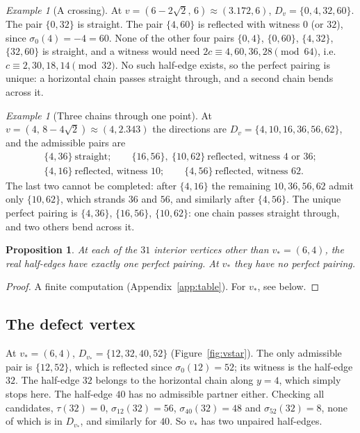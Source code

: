 \documentclass[11pt]{article}
\newtheorem{proposition}[theorem]{Proposition}
\theoremstyle{definition}
\theoremstyle{remark}
\newtheorem{example}[theorem]{Example}
\newcommand{\vstar}{v_\ast}
\begin{document}
\begin{example}[A crossing]\label{ex:deg4}
At $v=(6-2\sqrt2,\,6)\approx(3.172,6)$, $D_v=\{0,4,32,60\}$. The pair $\{0,32\}$ is straight. The pair $\{4,60\}$ is reflected with witness $0$ (or $32$), since $\sigma_0(4)=-4=60$. None of the other four pairs $\{0,4\}$, $\{0,60\}$, $\{4,32\}$, $\{32,60\}$ is straight, and a witness would need $2c\equiv 4,60,36,28\pmod{64}$, i.e.\ $c\equiv 2,30,18,14\pmod{32}$. No such half-edge exists, so the perfect pairing is unique: a horizontal chain passes straight through, and a second chain bends across it.
\end{example}

\begin{example}[Three chains through one point]\label{ex:deg6}
At $v=(4,\,8-4\sqrt2)\approx(4,2.343)$ the directions are $D_v=\{4,10,16,\allowbreak 36,56,62\}$, and the admissible pairs are
\[
\begin{gathered}
\{4,36\}\ \text{straight};\qquad \{16,56\},\ \{10,62\}\ \text{reflected, witness }4\text{ or }36;\\
\{4,16\}\ \text{reflected, witness }10;\qquad \{4,56\}\ \text{reflected, witness }62.
\end{gathered}
\]
The last two cannot be completed: after $\{4,16\}$ the remaining $10,36,56,62$ admit only $\{10,62\}$, which strands $36$ and $56$, and similarly after $\{4,56\}$. The unique perfect pairing is $\{4,36\}$, $\{16,56\}$, $\{10,62\}$: one chain passes straight through, and two others bend across it.
\end{example}

\begin{proposition}\label{prop:local}
At each of the $31$ interior vertices other than $\vstar=(6,4)$, the real half-edges have exactly one perfect pairing. At $\vstar$ they have no perfect pairing.
\end{proposition}
\begin{proof}
A finite computation (Appendix~\ref{app:table}). For $\vstar$, see below.
\end{proof}

\subsection{The defect vertex}\label{sec:defect}

At $\vstar=(6,4)$, $D_{\vstar}=\{12,32,40,52\}$ (Figure~\ref{fig:vstar}). The only admissible pair is $\{12,52\}$, which is reflected since $\sigma_0(12)=52$; its witness is the half-edge $32$. The half-edge $32$ belongs to the horizontal chain along $y=4$, which simply stops here. The half-edge $40$ has no admissible partner either. Checking all candidates, $\tau(32)=0$, $\sigma_{12}(32)=56$, $\sigma_{40}(32)=48$ and $\sigma_{52}(32)=8$, none of which is in $D_{\vstar}$, and similarly for $40$. So $\vstar$ has two unpaired half-edges.
\end{document}

